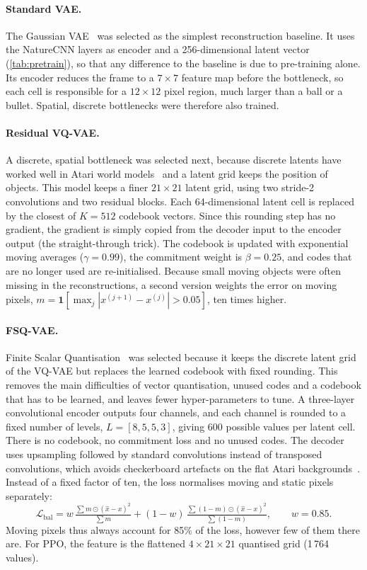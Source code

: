 \documentclass[runningheads,a4paper]{llncs}
\begin{document}
\paragraph{Standard VAE.} The Gaussian VAE~\cite{kingma2014vae} was selected as the simplest reconstruction baseline.
It uses the NatureCNN layers as encoder and a 256-dimensional latent vector
(\cref{tab:pretrain}), so that any difference to the baseline is due to pre-training alone. Its encoder reduces the frame to a
$7\times7$ feature map before the bottleneck, so each cell is responsible for a $12\times12$
pixel region, much larger than a ball or a bullet. Spatial, discrete bottlenecks were therefore
also trained.

\paragraph{Residual VQ-VAE.} A discrete, spatial bottleneck was selected next, because discrete
latents have worked well in Atari world models~\cite{hafner2021dreamerv2,micheli2023iris} and a
latent grid keeps the position of objects. This model keeps a finer $21\times21$ latent grid, using two
stride-2 convolutions and two residual blocks. Each 64-dimensional latent cell is replaced by
the closest of $K=512$ codebook vectors. Since this rounding step has no gradient, the
gradient is simply copied from the decoder input to the encoder output (the straight-through
trick). The codebook is updated with exponential moving averages
($\gamma=0.99$), the commitment weight is $\beta=0.25$, and codes that are no longer used are
re-initialised. Because small moving objects were often missing in the reconstructions, a
second version weights the error on moving pixels,
$m=\mathbf{1}[\max_j|x^{(j+1)}-x^{(j)}|>0.05]$, ten times higher.

\paragraph{FSQ-VAE.} Finite Scalar Quantisation~\cite{mentzer2024fsq} was selected because it
keeps the discrete latent grid of the VQ-VAE but replaces the learned codebook with fixed
rounding. This removes the main difficulties of vector quantisation, unused codes and a
codebook that has to be learned, and leaves fewer hyper-parameters to tune. A three-layer convolutional encoder outputs four channels, and each channel is
rounded to a fixed number of levels, $L=[8,5,5,3]$, giving 600 possible values per latent cell.
There is no codebook, no commitment loss and no unused codes. The decoder uses upsampling
followed by standard convolutions instead of transposed convolutions, which avoids checkerboard
artefacts on the flat Atari backgrounds~\cite{odena2016deconvolution}. Instead of a fixed factor
of ten, the loss normalises moving and static pixels separately:
\begin{equation}
  \mathcal{L}_{\text{bal}} = w\,\tfrac{\sum m\odot(\hat x-x)^2}{\sum m}
  +(1-w)\,\tfrac{\sum (1-m)\odot(\hat x-x)^2}{\sum (1-m)},\qquad w=0.85.
\end{equation}
Moving pixels thus always account for 85\% of the loss, however few of them there are.
For PPO, the feature is the flattened $4\times21\times21$ quantised grid (1\,764 values).
\end{document}
